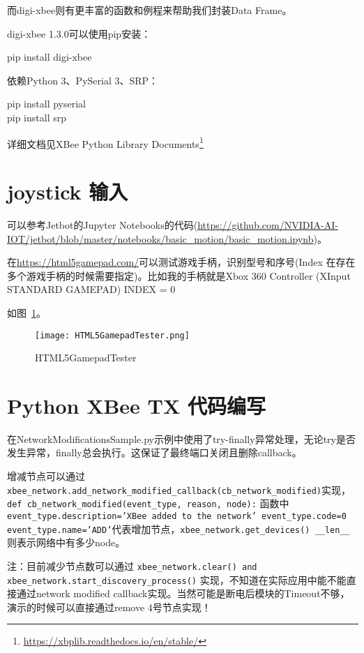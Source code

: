 而digi-xbee则有更丰富的函数和例程来帮助我们封装Data Frame。

digi-xbee 1.3.0可以使用pip安装：

\begin{tcolorbox}
    pip install digi-xbee
\end{tcolorbox}

依赖Python 3、PySerial 3、SRP：

\begin{tcolorbox}
    pip install pyserial \\
    pip install srp
\end{tcolorbox}

详细文档见XBee Python Library Documents\footnote{\url{https://xbplib.readthedocs.io/en/stable/}}

\section{joystick 输入}

可以参考Jetbot的Jupyter Notebooks的代码(\url{https://github.com/NVIDIA-AI-IOT/jetbot/blob/master/notebooks/basic_motion/basic_motion.ipynb})。

在\url{https://html5gamepad.com/}可以测试游戏手柄，识别型号和序号(Index 在存在多个游戏手柄的时候需要指定)。比如我的手柄就是Xbox 360 Controller (XInput STANDARD GAMEPAD) INDEX = 0

如图~\ref{fig:HTML5GamepadTester}。

\begin{figure}[htbp]
    \centering
    \texttt{[image: HTML5GamepadTester.png]}
    \caption{HTML5GamepadTester}
    \label{fig:HTML5GamepadTester}
\end{figure}

\section{Python XBee TX 代码编写}

在NetworkModificationsSample.py示例中使用了try-finally异常处理，无论try是否发生异常，finally总会执行。这保证了最终端口关闭且删除callback。

增减节点可以通过\texttt{xbee_network.add_network_modified_callback(cb_network_modified)}实现，\texttt{def cb_network_modified(event_type, reason, node):} 函数中\texttt{event_type.description='XBee added to the network' event_type.code=0 event_type.name='ADD'}代表增加节点，\texttt{xbee_network.get_devices() __len__}则表示网络中有多少node。

注：目前减少节点数可以通过 \texttt{xbee_network.clear() and xbee_network.start_discovery_process()} 实现，不知道在实际应用中能不能直接通过network modified callback实现。当然可能是断电后模块的Timeout不够，演示的时候可以直接通过remove 4号节点实现！

\texttt{}